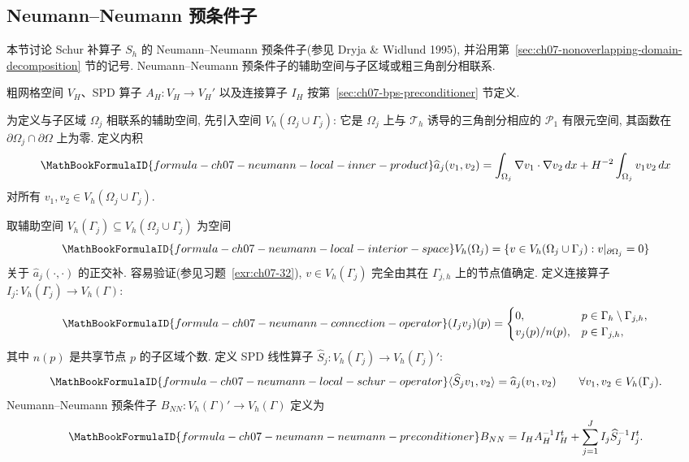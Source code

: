 \subsection{Neumann--Neumann 预条件子}
\label{sec:ch07-neumann-neumann-preconditioner}
\setcounter{thmcount}{0}
\setcounter{equation}{0}

本节讨论 Schur 补算子 $S_h$ 的 Neumann--Neumann 预条件子(参见 Dryja \& Widlund 1995), 并沿用第~\ref{sec:ch07-nonoverlapping-domain-decomposition} 节的记号. Neumann--Neumann 预条件子的辅助空间与子区域或粗三角剖分相联系.

粗网格空间 $V_H$、SPD 算子 $A_H:V_H\longrightarrow V_H'$ 以及连接算子 $I_H$ 按第~\ref{sec:ch07-bps-preconditioner} 节定义.

为定义与子区域 $\Omega_j$ 相联系的辅助空间, 先引入空间 $V_h(\Omega_j\cup\Gamma_j)$: 它是 $\Omega_j$ 上与 $\mathcal T_h$ 诱导的三角剖分相应的 $\mathcal P_1$ 有限元空间, 其函数在 $\partial\Omega_j\cap\partial\Omega$ 上为零. 定义内积
\begin{equation}
\MathBookFormulaID{formula-ch07-neumann-local-inner-product}
\label{eq:ch07-neumann-local-inner-product}
\widehat a_j(v_1,v_2)
=\int_{\Omega_j}\nabla v_1\cdot\nabla v_2\,dx
+H^{-2}\int_{\Omega_j}v_1v_2\,dx
\end{equation}
对所有 $v_1,v_2\in V_h(\Omega_j\cup\Gamma_j)$.

取辅助空间 $V_h(\Gamma_j)\subseteq V_h(\Omega_j\cup\Gamma_j)$ 为空间
\[
\MathBookFormulaID{formula-ch07-neumann-local-interior-space}
V_h(\Omega_j)=\{v\in V_h(\Omega_j\cup\Gamma_j):v|_{\partial\Omega_j}=0\}
\]
关于 $\widehat a_j(\cdot,\cdot)$ 的正交补. 容易验证(参见习题~\ref{exr:ch07-32}), $v\in V_h(\Gamma_j)$ 完全由其在 $\Gamma_{j,h}$ 上的节点值确定. 定义连接算子 $I_j:V_h(\Gamma_j)\longrightarrow V_h(\Gamma)$:
\begin{equation}
\MathBookFormulaID{formula-ch07-neumann-connection-operator}
\label{eq:ch07-neumann-connection-operator}
(I_jv_j)(p)=
\begin{cases}
0,&p\in\Gamma_h\setminus\Gamma_{j,h},\\
v_j(p)/n(p),&p\in\Gamma_{j,h},
\end{cases}
\end{equation}
其中 $n(p)$ 是共享节点 $p$ 的子区域个数. 定义 SPD 线性算子 $\widehat S_j:V_h(\Gamma_j)\longrightarrow V_h(\Gamma_j)'$:
\begin{equation}
\MathBookFormulaID{formula-ch07-neumann-local-schur-operator}
\label{eq:ch07-neumann-local-schur-operator}
\langle\widehat S_jv_1,v_2\rangle
=\widehat a_j(v_1,v_2)
\qquad\forall v_1,v_2\in V_h(\Gamma_j).
\end{equation}
Neumann--Neumann 预条件子 $B_{NN}:V_h(\Gamma)'\longrightarrow V_h(\Gamma)$ 定义为
\begin{equation}
\MathBookFormulaID{formula-ch07-neumann-neumann-preconditioner}
\label{eq:ch07-neumann-neumann-preconditioner}
B_{NN}=I_HA_H^{-1}I_H^t+\sum_{j=1}^{J}I_j\widehat S_j^{-1}I_j^t.
\end{equation}

